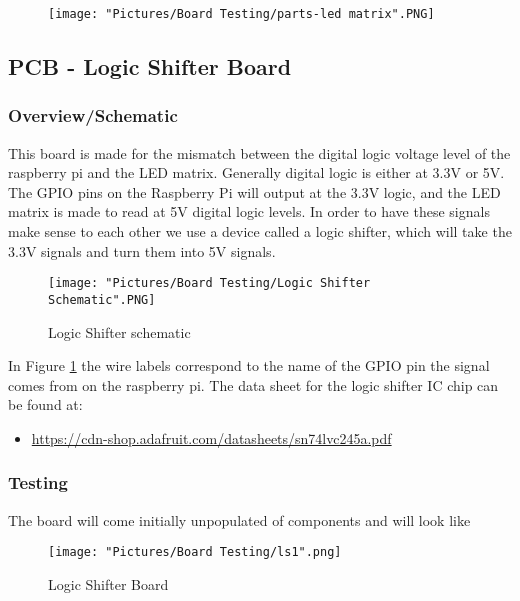 \documentclass[12pt]{article}
\begin{document}
\begin{figure}[H]
	\centering
	\texttt{[image: "Pictures/Board Testing/parts-led matrix".PNG]}
\end{figure}


\subsection{PCB - Logic Shifter Board} 
\subsubsection{Overview/Schematic}
This board is made for the mismatch between the digital logic voltage level of the raspberry pi and the LED matrix. Generally digital logic is either at 3.3V or 5V. The GPIO pins on the Raspberry Pi will output at the 3.3V logic, and the LED matrix is made to read at 5V digital logic levels. In order to have these signals make sense to each other we use a device called a logic shifter, which will take the 3.3V signals and turn them into 5V signals. 

\begin{figure}[H]
  	\centering
    	\texttt{[image: "Pictures/Board Testing/Logic Shifter Schematic".PNG]}
 	\caption{Logic Shifter schematic}
	\label{ls sch}
\end{figure}

In Figure \ref{ls sch} the wire labels correspond to the name of the GPIO pin the signal comes from on the raspberry pi. The data sheet for the logic shifter IC chip can be found at: 
\begin{itemize}
	\item \href{https://cdn-shop.adafruit.com/datasheets/sn74lvc245a.pdf}{https://cdn-shop.adafruit.com/datasheets/sn74lvc245a.pdf}
\end{itemize}

\subsubsection{Testing}

The board will come initially unpopulated of components and will look like

\begin{figure}[H]
  	\centering
    	\texttt{[image: "Pictures/Board Testing/ls1".png]}
 	\caption{Logic Shifter Board}
	\label{ls1}
\end{figure}
\end{document}
